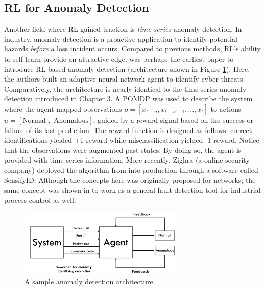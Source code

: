 \subsection{RL for Anomaly Detection}
Another field where RL gained traction is \textit{time series} anomaly detection. In industry, anomaly detection is a proactive application to identify potential hazards \textit{before} a loss incident occurs. Compared to previous methods, RL's ability to self-learn provide an attractive edge. \cite{seq_anomaly1} was perhaps the earliest paper to introduce RL-based anomaly detection (architecture shown in Figure \ref{fig:anomaly_detection}). Here, the authors built an adaptive neural network agent to identify cyber threats. Comparatively, the architecture is nearly identical to the time-series anomaly detection introduced in Chapter 3.  A POMDP was used to describe the system where the agent mapped observations $o = [x_{t-n}, x_{t-n+1}, ..., x_{t}]$ to actions $u = [\text{Normal }, \text{ Anomalous}]$, guided by a reward signal based on the success or failure of its last prediction. The reward function is designed as follows: correct identifications yielded +1 reward while misclassification yielded -1 reward. Notice that the observations were augmented past states. By doing so, the agent is provided with time-series information. More recently, Zighra (a online security company) deployed the algorithm from \cite{seq_anomaly1} into production through a software called SensifyID. Although the concepts here was originally proposed for networks; the same concept was shown in \cite{ftc} to work as a general fault detection tool for industrial process control as well.

\begin{figure}[H]
    \centering
    \includegraphics[width=0.7\textwidth]{images/ch5/anomaly_detection.jpeg}
    \caption{A sample anomaly detection architecture.}
    \label{fig:anomaly_detection}
\end{figure}   

